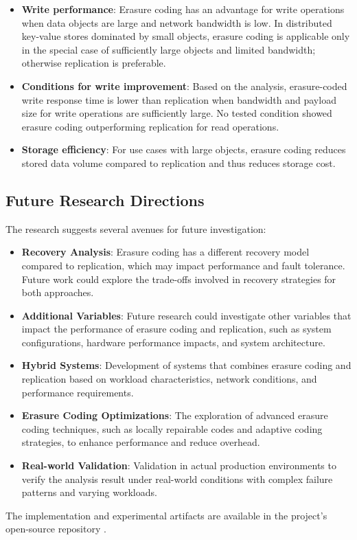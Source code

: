 \begin{itemize}
\item \textbf{Write performance}: Erasure coding has an advantage for write operations when data objects are large and network bandwidth is low. In distributed key-value stores dominated by small objects, erasure coding is applicable only in the special case of sufficiently large objects and limited bandwidth; otherwise replication is preferable.
\item \textbf{Conditions for write improvement}: Based on the analysis, erasure-coded write response time is lower than replication when bandwidth and payload size for write operations are sufficiently large. No tested condition showed erasure coding outperforming replication for read operations.
\item \textbf{Storage efficiency}: For use cases with large objects, erasure coding reduces stored data volume compared to replication and thus reduces storage cost.
\end{itemize}

\subsection{Future Research Directions}

The research suggests several avenues for future investigation:

\begin{itemize}
\item \textbf{Recovery Analysis}: Erasure coding has a different recovery model compared to replication, which may impact performance and fault tolerance. Future work could explore the trade-offs involved in recovery strategies for both approaches.
\item \textbf{Additional Variables}: Future research could investigate other variables that impact the performance of erasure coding and replication, such as system configurations, hardware performance impacts, and system architecture.
\item \textbf{Hybrid Systems}: Development of systems that combines erasure coding and replication based on workload characteristics, network conditions, and performance requirements.
\item \textbf{Erasure Coding Optimizations}: The exploration of advanced erasure coding techniques, such as locally repairable codes and adaptive coding strategies, to enhance performance and reduce overhead.
\item \textbf{Real-world Validation}: Validation in actual production environments to verify the analysis result under real-world conditions with complex failure patterns and varying workloads.
\end{itemize}

The implementation and experimental artifacts are available in the project's open-source repository \cite{ajiw2025distkv}.